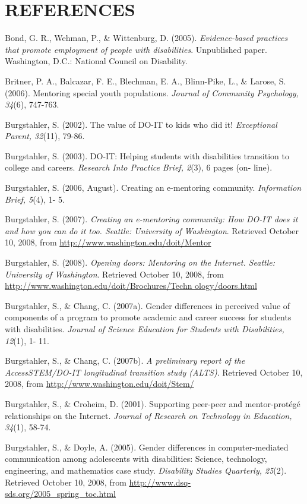 \documentclass[11.5pt]{sig-alternate} %
\begin{document}
\section*{REFERENCES}\par 

\leftskip 0.25in
\parindent -0.25in 
Bond, G. R., Wehman, P., \& Wittenburg, D. (2005). \textit{Evidence-based practices that promote employment of people with disabilities}. Unpublished paper. Washington, D.C.: National Council on Disability.

Britner, P. A., Balcazar, F. E., Blechman, E. A., Blinn-Pike, L., \& Larose, S. (2006). Mentoring special youth populations. \textit{Journal of Community Psychology, 34}(6), 747-763.

Burgstahler, S. (2002). The value of DO-IT to kids who did it!\textit{ Exceptional Parent, 32}(11), 79-86.

Burgstahler, S. (2003). DO-IT: Helping students with disabilities transition to college and careers. \textit{Research Into Practice Brief, 2}(3), 6 pages (on- line).

Burgstahler, S. (2006, August). Creating an e-mentoring community. \textit{Information Brief, 5}(4), 1-
5.

Burgstahler, S. (2007).\textit{ Creating an e-mentoring community: How DO-IT does it and how you can do it too. Seattle: University of Washington}. Retrieved October 10, 2008, from \url{http://www.washington.edu/doit/Mentor}

Burgstahler, S. (2008).\textit{ Opening doors: Mentoring on the Internet. Seattle: University of Washington}. Retrieved October 10, 2008, from \url{http://www.washington.edu/doit/Brochures/Techn ology/doors.html}

Burgstahler, S., \& Chang, C. (2007a). Gender differences in perceived value of components of a program to promote academic and career success for students with disabilities. \textit{Journal of Science Education for Students with Disabilities, 12}(1), 1- 11.

Burgstahler, S., \& Chang, C. (2007b). \textit{A preliminary report of the AccessSTEM/DO-IT longitudinal transition study (ALTS)}. Retrieved October 10, 2008, from \url{http://www.washington.edu/doit/Stem/}

Burgstahler, S., \& Croheim, D. (2001). Supporting peer-peer and mentor-protégé relationships on the Internet. \textit{Journal of Research on Technology in Education, 34}(1), 58-74.

Burgstahler, S., \& Doyle, A. (2005). Gender differences in computer-mediated communication among adolescents with disabilities: Science, technology, engineering, and mathematics case study. \textit{Disability Studies Quarterly, 25}(2). Retrieved October 10, 2008, from \url{http://www.dsq- sds.org/2005_spring_toc.html}
\end{document}

